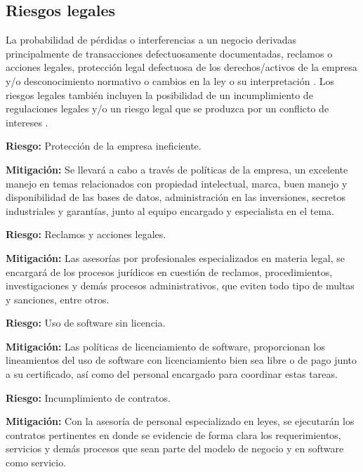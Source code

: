 \subsection{Riesgos legales}
La probabilidad de pérdidas o interferencias a un negocio derivadas principalmente de transacciones defectuosamente documentadas, reclamos o acciones legales, protección legal defectuosa de los derechos/activos de la empresa y/o desconocimiento normativo o cambios en la ley o su interpretación \cite{danielPerez}. Los riesgos legales también incluyen la posibilidad de un incumplimiento de regulaciones legales y/o un riesgo legal que se produzca por un conflicto de intereses \cite{empresa_2015}.

\textbf{Riesgo:} Protección de la empresa ineficiente.

\textbf{Mitigación:} Se llevará a cabo a través de políticas de la empresa, un excelente manejo en temas relacionados con propiedad intelectual, marca, buen manejo y disponibilidad de las bases de datos, administración en las inversiones, secretos industriales y garantías, junto al equipo encargado y especialista en el tema.

\textbf{Riesgo:} Reclamos y acciones legales.

\textbf{Mitigación:} Las asesorías por profesionales especializados en materia legal, se encargará de los procesos jurídicos en cuestión de reclamos, procedimientos, investigaciones y demás procesos administrativos, que eviten todo tipo de multas y sanciones, entre otros.

\textbf{Riesgo:} Uso de software sin licencia.


\textbf{Mitigación:} Las políticas de licenciamiento de software, proporcionan los lineamientos del uso de software con licenciamiento bien sea libre o de pago junto a su certificado, así como del personal encargado para coordinar estas tareas.

\textbf{Riesgo:} Incumplimiento de contratos.


\textbf{Mitigación:} Con la asesoría de personal especializado en leyes, se ejecutarán los contratos pertinentes en donde se evidencie de forma clara los requerimientos, servicios y demás procesos que sean parte del modelo de negocio y en software como servicio.